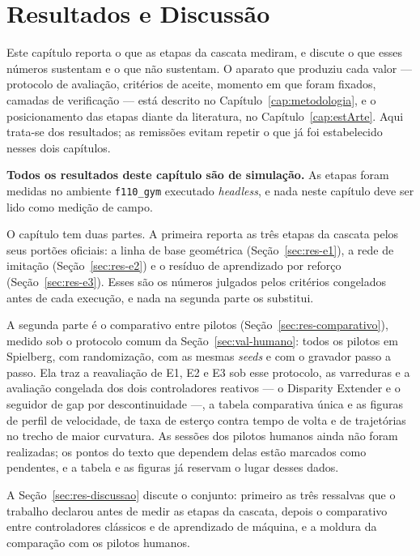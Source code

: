 \chapter{Resultados e Discussão}\label{cap:resultados}

Este capítulo reporta o que as etapas da cascata mediram, e discute o que
esses números sustentam e o que não sustentam. O aparato que produziu cada valor
--- protocolo de avaliação, critérios de aceite, momento em que foram fixados,
camadas de verificação --- está descrito no Capítulo~\ref{cap:metodologia}, e o
posicionamento das etapas diante da literatura, no
Capítulo~\ref{cap:estArte}. Aqui trata-se dos resultados; as remissões evitam
repetir o que já foi estabelecido nesses dois capítulos.

\textbf{Todos os resultados deste capítulo são de simulação.} As etapas foram
medidas no ambiente \texttt{f110\_gym} \cite{OKelly2020F1TENTH} executado
\textit{headless}, e nada neste capítulo deve ser lido como medição de campo.

O capítulo tem duas partes. A primeira reporta as três etapas da cascata pelos
seus portões oficiais: a linha de base geométrica (Seção~\ref{sec:res-e1}), a
rede de imitação (Seção~\ref{sec:res-e2}) e o resíduo de aprendizado por reforço
(Seção~\ref{sec:res-e3}). Esses são os números julgados pelos critérios
congelados antes de cada execução, e nada na segunda parte os substitui.

A segunda parte é o comparativo entre pilotos (Seção~\ref{sec:res-comparativo}),
medido sob o protocolo comum da Seção~\ref{sec:val-humano}: todos os pilotos em
Spielberg, com randomização, com as mesmas \textit{seeds} e com o gravador passo
a passo. Ela traz a reavaliação de E1, E2 e E3 sob esse protocolo, as varreduras
e a avaliação congelada dos dois controladores reativos --- o Disparity Extender
e o seguidor de gap por descontinuidade ---, a tabela comparativa única e as
figuras de perfil de velocidade, de taxa de esterço contra tempo de volta e de
trajetórias no trecho de maior curvatura. As sessões dos pilotos humanos ainda
não foram realizadas; os pontos do texto que dependem delas estão marcados como
pendentes, e a tabela e as figuras já reservam o lugar desses dados.

A Seção~\ref{sec:res-discussao} discute o conjunto: primeiro as três ressalvas
que o trabalho declarou antes de medir as etapas da cascata, depois o
comparativo entre controladores clássicos e de aprendizado de máquina, e a
moldura da comparação com os pilotos humanos.

